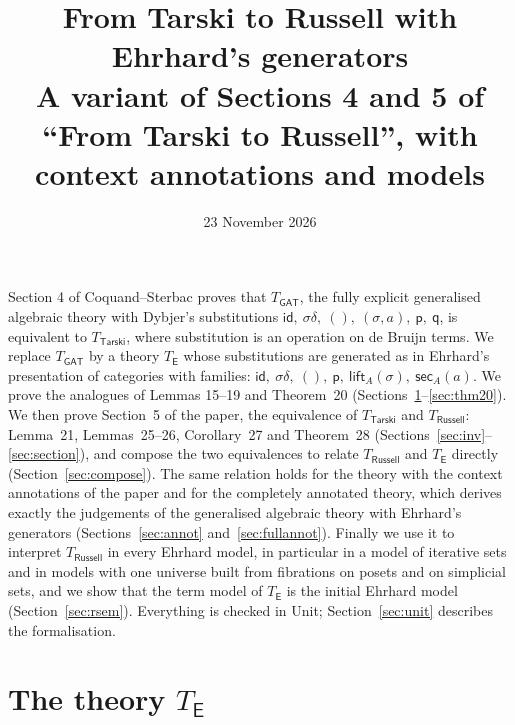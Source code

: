\documentclass[11pt]{article}
\title{From Tarski to Russell with Ehrhard's generators\\[2pt]
\large A variant of Sections 4 and 5 of ``From Tarski to Russell'',
with context annotations and models}
\author{}
\date{23 November 2026}
\theoremstyle{definition}
\theoremstyle{remark}
\newcommand{\p}{\mathsf p}
\newcommand{\q}{\mathsf q}
\newcommand{\id}{\mathsf{id}}
\newcommand{\lift}{\mathsf{lift}}
\newcommand{\sect}{\mathsf{sec}}
\begin{document}
\maketitle

\noindent
Section 4 of Coquand--Sterbac proves that $T_{\mathsf{GAT}}$, the fully
explicit generalised algebraic theory with Dybjer's substitutions
$\id,\ \sigma\delta,\ (),\ (\sigma,a),\ \p,\ \q$, is equivalent to
$T_{\mathsf{Tarski}}$, where substitution is an operation on de Bruijn
terms. We replace $T_{\mathsf{GAT}}$ by a theory $T_{\mathsf E}$ whose
substitutions are generated as in Ehrhard's presentation of categories with
families: $\id,\ \sigma\delta,\ (),\ \p,\ \lift_A(\sigma),\ \sect_A(a)$.
We prove the analogues of Lemmas 15--19 and Theorem~20
(Sections~\ref{sec:te}--\ref{sec:thm20}). We then prove Section~5 of the
paper, the equivalence of $T_{\mathsf{Tarski}}$ and $T_{\mathsf{Russell}}$:
Lemma~21, Lemmas~25--26, Corollary~27 and Theorem~28
(Sections~\ref{sec:inv}--\ref{sec:section}), and compose the two
equivalences to relate $T_{\mathsf{Russell}}$ and $T_{\mathsf E}$ directly
(Section~\ref{sec:compose}). The same relation holds for the theory with
the context annotations of the paper and for the completely annotated
theory, which derives exactly the judgements of the generalised algebraic
theory with Ehrhard's generators (Sections~\ref{sec:annot}
and~\ref{sec:fullannot}). Finally we use
it to interpret $T_{\mathsf{Russell}}$ in every Ehrhard model, in
particular in a model of iterative sets and in models with one universe built
from fibrations on posets and on simplicial sets, and we show that the
term model of $T_{\mathsf E}$ is the initial Ehrhard model (Section~\ref{sec:rsem}). Everything is checked in Unit;
Section~\ref{sec:unit} describes the formalisation.

\section{The theory $T_{\mathsf E}$}\label{sec:te}
\end{document}
